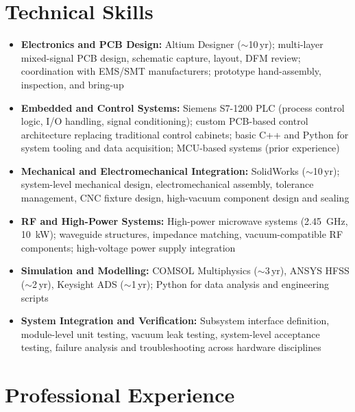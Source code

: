 \documentclass[a4paper,11pt]{article}
\begin{document}
\section*{Technical Skills}

\begin{itemize}[noitemsep, topsep=2pt, leftmargin=*]
    \item \textbf{Electronics and PCB Design:}
          Altium Designer ($\sim$10\,yr); multi-layer mixed-signal PCB design,
          schematic capture, layout, DFM review; coordination with EMS/SMT
          manufacturers; prototype hand-assembly, inspection, and bring-up

    \item \textbf{Embedded and Control Systems:}
          Siemens S7-1200 PLC (process control logic, I/O handling, signal
          conditioning); custom PCB-based control architecture replacing
          traditional control cabinets; basic C++ and Python for system
          tooling and data acquisition; MCU-based systems (prior experience)

    \item \textbf{Mechanical and Electromechanical Integration:}
          SolidWorks ($\sim$10\,yr); system-level mechanical design,
          electromechanical assembly, tolerance management, CNC fixture design,
          high-vacuum component design and sealing

    \item \textbf{RF and High-Power Systems:}
          High-power microwave systems (2.45~GHz, 10~kW); waveguide structures,
          impedance matching, vacuum-compatible RF components; high-voltage
          power supply integration

    \item \textbf{Simulation and Modelling:}
          COMSOL Multiphysics ($\sim$3\,yr), ANSYS HFSS ($\sim$2\,yr),
          Keysight ADS ($\sim$1\,yr); Python for data analysis and engineering scripts

    \item \textbf{System Integration and Verification:}
          Subsystem interface definition, module-level unit testing,
          vacuum leak testing, system-level acceptance testing,
          failure analysis and troubleshooting across hardware disciplines
\end{itemize}

\section*{Professional Experience}
\end{document}
